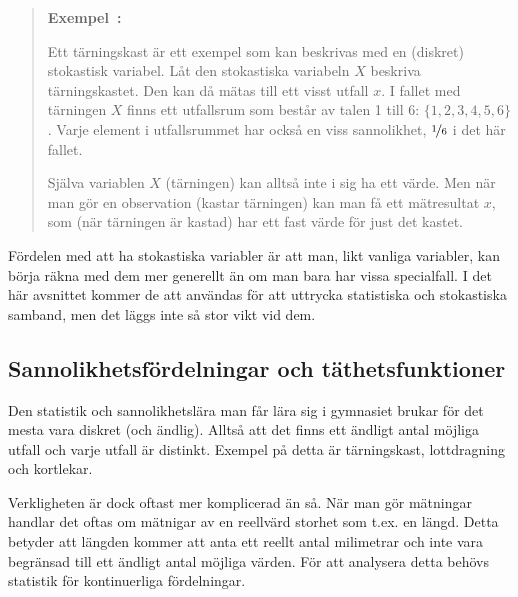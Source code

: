 \documentclass[11pt,a4paper, swedish
]{article}
\newcounter{exempel_counter}%
\newenvironment{exempel}
{
  \refstepcounter{exempel_counter}
  \begin{quote}
  \noindent\textbf{Exempel~\arabic{exempel_counter}:}
}{
  \end{quote}
}
\begin{document}
\begin{exempel}
Ett tärningskast är ett exempel som kan beskrivas med en (diskret)
stokastisk variabel. Låt den stokastiska variabeln $X$ beskriva
tärningskastet. Den kan då mätas till ett visst utfall 
$x$. I fallet med tärningen $X$ finns ett utfallsrum som består av
talen 1 till 6: $\{1, 2, 3, 4, 5, 6\}$. Varje element i utfallsrummet
har också en viss sannolikhet, $\nicefrac{1}{6}$ i det här fallet.
 
Själva variablen $X$ (tärningen) kan alltså inte i sig ha ett värde.
Men när man gör en observation (kastar tärningen) kan man få ett
mätresultat $x$, som (när tärningen är kastad) har ett fast värde för
just det kastet. 
\end{exempel}

Fördelen med att ha stokastiska variabler är att man, likt vanliga
variabler, kan börja räkna med dem mer generellt än om man bara har
vissa specialfall. I det här avsnittet kommer de att användas för att
uttrycka statistiska och stokastiska samband, men det läggs inte så
stor vikt vid dem. 

\subsection{Sannolikhetsfördelningar och täthetsfunktioner}
Den statistik och sannolikhetslära man får lära sig i gymnasiet brukar
för det mesta vara diskret (och ändlig). Alltså att det finns ett
ändligt antal möjliga utfall och varje utfall är distinkt. Exempel på
detta är tärningskast, lottdragning och kortlekar. 

Verkligheten är dock oftast mer komplicerad än så. När man gör
mätningar handlar det oftas om mätnigar av en reellvärd storhet som
t.ex. en längd\footnotemark{}. Detta betyder att längden kommer att
anta ett reellt antal milimetrar och inte vara begränsad till ett
ändligt antal möjliga värden. För att analysera detta behövs statistik
för kontinuerliga fördelningar.  
\end{document}
